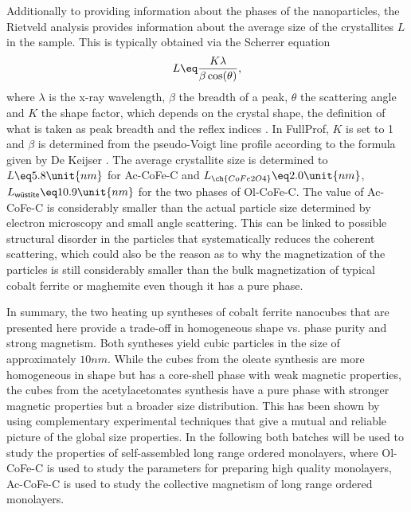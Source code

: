 \documentclass[\main/dresen_thesis.tex]{subfiles}
\begin{document}
    Additionally to providing information about the phases of the nanoparticles, the Rietveld analysis provides information about the average size of the crystallites $L$ in the sample.
    This is typically obtained via the Scherrer equation
    \begin{equation}
      L \eq \frac{K \lambda}{\beta \cos(\theta)},
    \end{equation}
    where $\lambda$ is the x-ray wavelength, $\beta$ the breadth of a peak, $\theta$ the scattering angle and $K$ the shape factor, which depends on the crystal shape, the definition of what is taken as peak breadth and the reflex indices \cite{Langford_1978_Scher}.
    In FullProf, $K$ is set to 1 and $\beta$ is determined from the pseudo-Voigt line profile according to the formula given by De Keijser \cite{DeKeijser_1982_Useof}.
    The average crystallite size is determined to $L \eq 5.8 \unit{nm}$ for Ac-CoFe-C and $L_{\ch{CoFe2O4}} \eq 2.0 \unit{nm}$, $L_{\textsf{w\"ustite}} \eq 10.9 \unit{nm}$ for the two phases of Ol-CoFe-C.
    The value of Ac-CoFe-C is considerably smaller than the actual particle size determined by electron microscopy and small angle scattering.
    This can be linked to possible structural disorder in the particles that systematically reduces the coherent scattering, which could also be the reason as to why the magnetization of the particles is still considerably smaller than the bulk magnetization of typical cobalt ferrite or maghemite even though it has a pure phase.

    In summary, the two heating up syntheses of cobalt ferrite nanocubes that are presented here provide a trade-off in homogeneous shape vs. phase purity and strong magnetism.
    Both syntheses yield cubic particles in the size of approximately $10 \unit{nm}$.
    While the cubes from the oleate synthesis are more homogeneous in shape but has a core-shell phase with weak magnetic properties, the cubes from the acetylacetonates synthesis have a pure phase with stronger magnetic properties but a broader size distribution.
    This has been shown by using complementary experimental techniques that give a mutual and reliable picture of the global size properties.
    In the following both batches will be used to study the properties of self-assembled long range ordered monolayers, where Ol-CoFe-C is used to study the parameters for preparing high quality monolayers, Ac-CoFe-C is used to study the collective magnetism of long range ordered monolayers.
\end{document}
